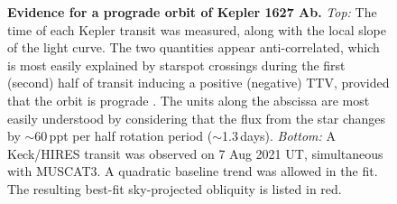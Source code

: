 \documentclass[12pt,modern,twocolumn,tighten]{aastex63}
\begin{document}
\begin{figure}[tp]
	\begin{center}
		\leavevmode
		
	\end{center}
	\vspace{-0.7cm}
	\caption{
		{\bf Evidence for a prograde orbit of Kepler 1627 Ab.}
    {\it Top:} 
    The time of each Kepler transit was measured, along with the local slope
    of the light curve.  The two quantities appear anti-correlated,
    which is most easily explained by starspot crossings during the
    first (second) half of transit inducing a positive (negative) TTV,
    provided that the orbit is prograde \citep{mazeh_time_2015}.  The
    units along the abscissa are most easily understood by considering
    that the flux from the star changes by $\sim$60\,ppt per half
    rotation period ($\sim$1.3\,days).
        {\it Bottom:} A Keck/HIRES transit was observed on 7 Aug 2021 UT,
    simultaneous with MUSCAT3.  A quadratic baseline trend was allowed
    in the fit.
    The resulting best-fit sky-projected obliquity is listed in red.
    \label{fig:obliquity}
	}
\end{figure}
\end{document}
